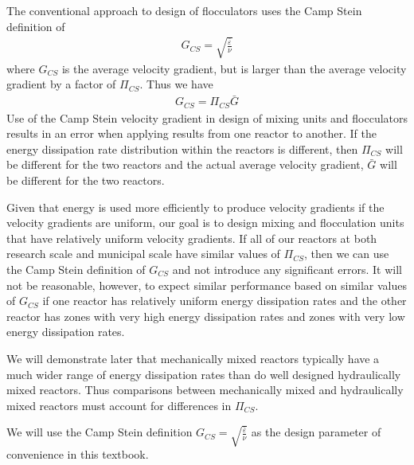 \documentclass[letterpaper,10pt,english]{sphinxmanual}
\begin{document}
The conventional approach to design of flocculators uses the Camp Stein definition of
\begin{equation}\label{equation:Rapid_Mix/RM_Theory_and_Future_Work:Rapid_Mix/RM_Theory_and_Future_Work:11}
\begin{split}G_{CS} = \sqrt{\frac{\bar\varepsilon}{\nu}}\end{split}
\end{equation}
where \(G_{CS}\) is  the average velocity gradient, but is larger than the average velocity gradient by a factor of \(\Pi_{CS}\). Thus we have
\begin{equation}\label{equation:Rapid_Mix/RM_Theory_and_Future_Work:Rapid_Mix/RM_Theory_and_Future_Work:12}
\begin{split}G_{CS} = \Pi_{CS}\bar G\end{split}
\end{equation}
Use of the Camp Stein velocity gradient in design of mixing units and flocculators results in an error when applying results from one reactor to another. If the energy dissipation rate distribution within the reactors is different, then \(\Pi_{CS}\) will be different for the two reactors and the actual average velocity gradient, \(\bar G\) will be different for the two reactors.

Given that energy is used more efficiently to produce velocity gradients if the velocity gradients are uniform, our goal is to design mixing and flocculation units that have relatively uniform velocity gradients. If all of our reactors at both research scale and municipal scale have similar values of \(\Pi_{CS}\), then we can use the Camp Stein definition of \(G_{CS}\) and not introduce any significant errors. It will not be reasonable, however, to expect similar performance based on similar values of \(G_{CS}\) if one reactor has relatively uniform energy dissipation rates and the other reactor has zones with very high energy dissipation rates and zones with very low energy dissipation rates.

We will demonstrate later that mechanically mixed reactors typically have a much wider range of energy dissipation rates than do well designed hydraulically mixed reactors. Thus comparisons between mechanically mixed and hydraulically mixed reactors must account for differences in \(\Pi_{CS}\).

We will use the Camp Stein definition \(G_{CS} = \sqrt{\frac{\bar\varepsilon}{\nu}}\) as the design parameter of convenience in this textbook.
\end{document}
